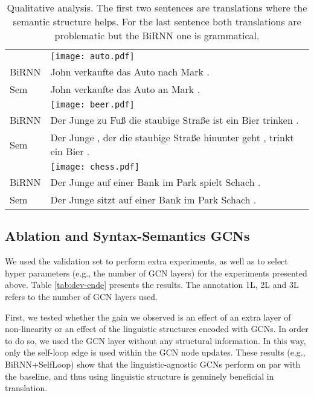\documentclass[11pt,a4paper]{article}
\begin{document}
\begin{table*}[h]
\centering
\begin{tabular}{@{}ll@{}} 
\toprule
& \texttt{[image: auto.pdf]}
 \\
BiRNN  & John verkaufte das Auto nach Mark . \\
Sem	&  John verkaufte das Auto an Mark .	\\
\midrule
& \texttt{[image: beer.pdf]} \\
BiRNN  & Der Junge zu Fu{\ss} die staubige Stra{\ss}e ist ein Bier trinken . \\
Sem 	&  Der Junge , der die staubige Stra{\ss}e hinunter geht , trinkt ein Bier .	\\
\midrule
& \texttt{[image: chess.pdf]} \\
BiRNN  & Der Junge auf einer Bank im Park spielt Schach . \\
Sem 	&  Der Junge sitzt auf einer Bank im Park Schach .	\\
\bottomrule
\end{tabular}
\caption{Qualitative analysis. The first two sentences are translations where the semantic structure helps. For the last sentence both translations are problematic but the BiRNN one is grammatical.}
\label{tab:qualitative}
\end{table*}
\subsection{Ablation and Syntax-Semantics GCNs}

We used the validation set to perform extra experiments, as well as to select hyper parameters (e.g., the number of GCN layers) for the experiments presented above. Table \ref{tab:dev-ende} presents the results. The annotation 1L, 2L and 3L refers to the number of GCN layers used.

First, we tested whether the gain we observed is an effect of an extra layer of non-linearity or an effect of the linguistic structures encoded with GCNs. In order to do so, we used the GCN layer without any structural information.
In this way, only the self-loop edge is used within the GCN node updates.
These results (e.g., BiRNN+SelfLoop) show that the linguistic-agnostic GCNs  perform on par with the baseline, and thus using linguistic structure is genuinely beneficial in translation.
\end{document}
